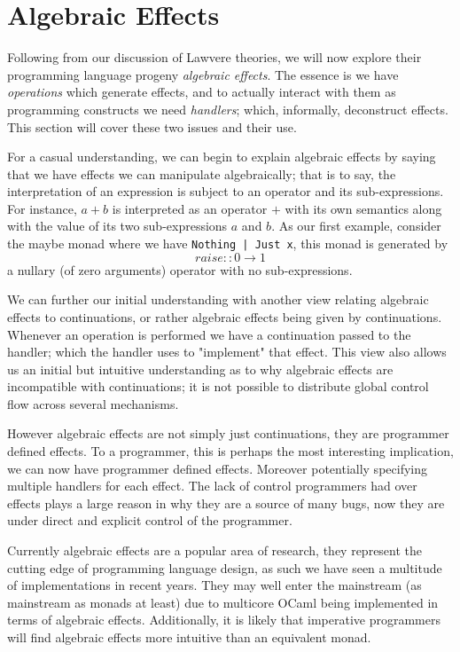 \section{Algebraic Effects}
Following from our discussion of Lawvere theories,
we will now explore their programming language progeny \textit{algebraic effects}.
The essence is we have \textit{operations} which generate effects,
and to actually interact with them as programming constructs
we need \textit{handlers}\cite{plotkin2009handlers};
which, informally, deconstruct effects.
This section will cover these two issues and their use.

For a casual understanding,
we can begin to explain algebraic effects by saying that
we have effects we can manipulate algebraically; that is to say,
the interpretation of an expression is
subject to an operator and its sub-expressions.
For instance, $a + b$ is interpreted as an operator
$+$ with its own semantics along with the value of its
two sub-expressions $a$ and $b$.
As our first example, consider the maybe monad where we have
\texttt{Nothing | Just x},
this monad is generated by
\begin{equation}
    raise :: 0 \rightarrow 1
\end{equation}
a nullary (of zero arguments) operator with no sub-expressions.

We can further our initial understanding with another view
relating algebraic effects to continuations,
or rather algebraic effects being given by continuations.
Whenever an operation is performed we have a continuation
passed to the handler;
which the handler uses to "implement" that effect.
This view also allows us an initial but intuitive
understanding as to why algebraic effects are incompatible with continuations;
it is not possible to distribute global control flow across several mechanisms.

However algebraic effects are not simply just continuations,
they are programmer defined effects.
To a programmer, this is perhaps the most interesting implication,
we can now have programmer defined effects.
Moreover potentially specifying multiple handlers for each effect.
The lack of control programmers had over effects plays
a large reason in why they are a source of many bugs,
now they are under direct and explicit control of the programmer.

Currently algebraic effects are a popular area of research,
they represent the cutting edge of programming language design,
as such we have seen a multitude of implementations in recent years.
They may well enter the mainstream (as mainstream as monads at least)
due to multicore OCaml being implemented in terms of algebraic effects.
Additionally, it is likely that imperative programmers
will find algebraic effects more intuitive than an equivalent monad.

